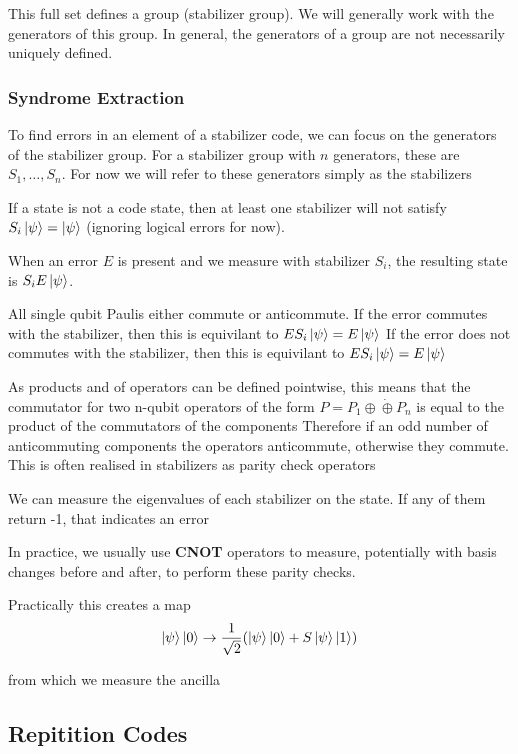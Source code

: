 \documentclass[a4paper,12pt]{article}
\begin{document}
This full set defines a group (stabilizer group). We will generally work with the generators of this group.
In general, the generators of a group are not necessarily uniquely defined.

\subsubsection{Syndrome Extraction}
To find errors in an element of a stabilizer code, we can focus on the generators of the stabilizer group.
For a stabilizer group with $n$ generators, these are ${S_1, \ldots ,S_n}$. For now we will refer to these generators simply as the stabilizers

If a state is not a code state, then at least one stabilizer will not satisfy $S_i\ket{\psi} = \ket{\psi}$ (ignoring logical errors for now).

When an error $E$ is present and we measure with stabilizer $S_i$, the resulting state is $S_iE\ket{\psi}$.


All single qubit Paulis either commute or anticommute.
If the error commutes with the stabilizer, then this is equivilant to $ES_i\ket{\psi} = E\ket{\psi}$
If the error does not commutes with the stabilizer, then this is equivilant to $ES_i\ket{\psi} = E\ket{\psi}$

As products and of operators can be defined pointwise, this means that the commutator for two n-qubit operators of the form $P = P_1 \oplus \dot  \oplus P_n$ is equal to the product of the commutators of the components
Therefore if an odd number of anticommuting components the operators anticommute, otherwise they commute. This is often realised in stabilizers as parity check operators

We can measure the eigenvalues of each stabilizer on the state. If any of them return -1, that indicates an error

In practice, we usually use \textbf{CNOT} operators to measure, potentially with basis changes before and after, to perform these parity checks.

Practically this creates a map
\begin{equation}
    \ket{\psi}\ket{0} \rightarrow \frac{1}{\sqrt{2}} (\ket{\psi}\ket{0} + S\ket{\psi}\ket{1})
\end{equation}

from which we measure the ancilla

\subsection{Repitition Codes}
\end{document}
